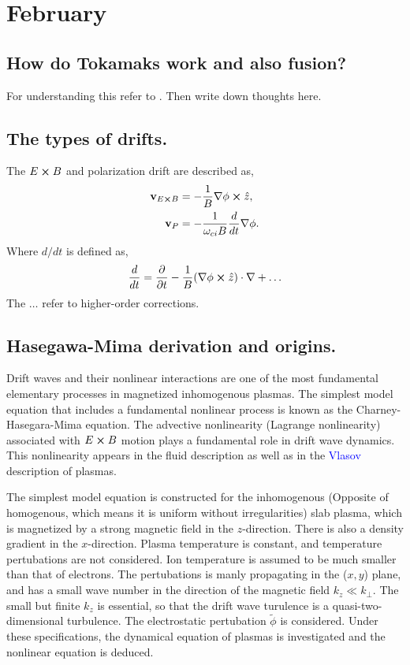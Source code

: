 \section{February}

\subsection{How do Tokamaks work and also fusion?}
For understanding this refer to \cite{dini2009overview}. Then write down thoughts here. 

\subsection{The types of drifts.}
The $E \cross B$ and polarization drift are described as, 
\begin{align}
	\bold{v}_{E \cross B} &= -\frac{1}{B} \nabla \phi \cross \hat{z}, \\
	\bold{v}_{P} &= - \frac{1}{\omega_{ci} B} \frac{d}{dt} \nabla \phi. 
\end{align}
Where $d/dt$ is defined as, 
\begin{align}
	\frac{d}{dt} = \frac{\partial}{\partial t} - \frac{1}{B} (\nabla \phi \cross \hat{z}) \cdot \nabla + \dots
\end{align}
The $\dots$ refer to higher-order corrections. 


\subsection{Hasegawa-Mima derivation and origins.}
Drift waves and their nonlinear interactions are one of the most fundamental elementary processes in magnetized inhomogenous plasmas. The simplest model equation that includes a fundamental nonlinear process is known as the Charney-Hasegara-Mima equation. The advective nonlinearity (Lagrange nonlinearity) associated with $E \cross B$ motion plays a fundamental role in drift wave dynamics. This nonlinearity appears in the fluid description as well as in the \textcolor{blue}{Vlasov} description of plasmas.

The simplest model equation is constructed for the inhomogenous (Opposite of homogenous, which means it is uniform without irregularities) slab plasma, which is magnetized by a strong magnetic field in the $z$-direction. There is also a density gradient in the $x$-direction. Plasma temperature is constant, and temperature pertubations are not considered. Ion temperature is assumed to be much smaller than that of electrons. The pertubations is manly propagating in the ($x,y$) plane, and has a small wave number in the direction of the magnetic field $k_z \ll k_{\perp}$. The small but finite $k_z$ is essential, so that the drift wave turulence is a quasi-two-dimensional turbulence. The electrostatic pertubation $\tilde{\phi}$ is considered. Under these specifications, the dynamical equation of plasmas is investigated and the nonlinear equation is deduced. 

